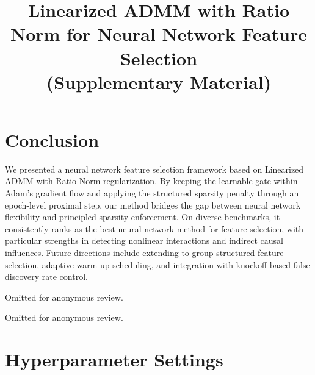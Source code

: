 \documentclass{uai2026} %
\theoremstyle{definition}
\theoremstyle{remark}
\begin{document}
\section{Conclusion}\label{sec:conclusion}

We presented a neural network feature selection framework based on Linearized ADMM with Ratio Norm regularization.
By keeping the learnable gate within Adam's gradient flow and applying the structured sparsity penalty through an epoch-level proximal step, our method bridges the gap between neural network flexibility and principled sparsity enforcement.
On diverse benchmarks, it consistently ranks as the best neural network method for feature selection, with particular strengths in detecting nonlinear interactions and indirect causal influences.
Future directions include extending to group-structured feature selection, adaptive warm-up scheduling, and integration with knockoff-based false discovery rate control.


\begin{contributions}
    Omitted for anonymous review.
\end{contributions}

\begin{acknowledgements}
    Omitted for anonymous review.
\end{acknowledgements}



\newpage
\onecolumn
\title{Linearized ADMM with Ratio Norm for Neural Network Feature Selection\\(Supplementary Material)}
\maketitle

\appendix

\section{Hyperparameter Settings}\label{app:hparams}
\end{document}
